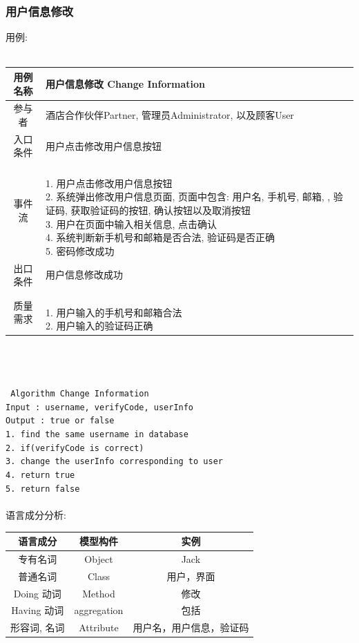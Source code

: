 \documentclass[11pt]{article}
\begin{document}
		\subsubsection{用户信息修改}
			用例: \\ \\
			\begin{tabular}{c|l}
			\hline
			用例名称 & 用户信息修改 Change Information \\ \hline
			参与者 & 酒店合作伙伴Partner, 管理员Administrator, 以及顾客User  \\ \hline
			入口条件 & 用户点击修改用户信息按钮 \\ \hline
			事件流 & 	\parbox{33em}{\ \\
						1. 用户点击修改用户信息按钮 \\
						2. 系统弹出修改用户信息页面, 页面中包含: 用户名, 手机号, 邮箱, , 验证码, 获取验证码的按钮, 确认按钮以及取消按钮\\
						3. 用户在页面中输入相关信息, 点击确认  \\
						4. 系统判断新手机号和邮箱是否合法, 验证码是否正确 \\
						5. 密码修改成功 \\
						} \\ \hline
			出口条件 & 用户信息修改成功 \\ \hline
			质量需求 & \parbox{33em}{\ \\
						1. 用户输入的手机号和邮箱合法 \\
						2. 用户输入的验证码正确 \\
						} \\ \hline
			\end{tabular}\\ \\ \\
			\texttt{
			Algorithm Change Information \\
			Input : username, verifyCode, userInfo \\
			Output : true or false \\
			1. find the same username in database \\
			2. if(verifyCode is correct) \\
			3.     change the userInfo corresponding to user \\
			4.     return true \\
			5. return false \\
			} \\
			
			语言成分分析:
			\begin{center}
			\begin{tabular}{|c|c|c|}
			\hline
			语言成分 & 模型构件 & 实例\\ \hline
			专有名词 & Object & Jack  \\ \hline
			普通名词 & Class & 用户，界面 \\ \hline
			Doing 动词 & Method &  修改 \\ \hline
			Having 动词 & aggregation & 包括 \\ \hline
			形容词, 名词 & Attribute & 用户名，用户信息，验证码 \\ \hline
			\end{tabular}
			\end{center}
			
\end{document}
